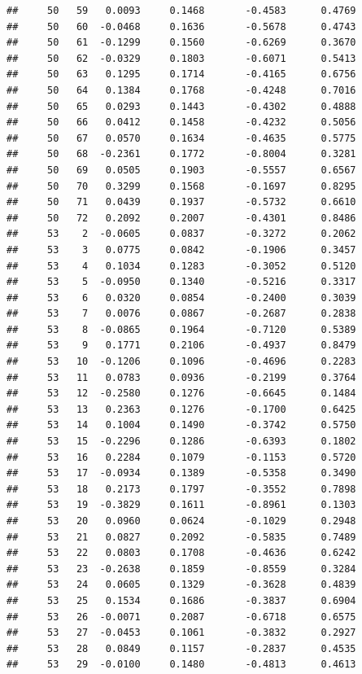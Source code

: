 \documentclass[
]{article}
\begin{document}
\begin{verbatim}
##     50   59   0.0093     0.1468       -0.4583      0.4769  
##     50   60  -0.0468     0.1636       -0.5678      0.4743  
##     50   61  -0.1299     0.1560       -0.6269      0.3670  
##     50   62  -0.0329     0.1803       -0.6071      0.5413  
##     50   63   0.1295     0.1714       -0.4165      0.6756  
##     50   64   0.1384     0.1768       -0.4248      0.7016  
##     50   65   0.0293     0.1443       -0.4302      0.4888  
##     50   66   0.0412     0.1458       -0.4232      0.5056  
##     50   67   0.0570     0.1634       -0.4635      0.5775  
##     50   68  -0.2361     0.1772       -0.8004      0.3281  
##     50   69   0.0505     0.1903       -0.5557      0.6567  
##     50   70   0.3299     0.1568       -0.1697      0.8295  
##     50   71   0.0439     0.1937       -0.5732      0.6610  
##     50   72   0.2092     0.2007       -0.4301      0.8486  
##     53    2  -0.0605     0.0837       -0.3272      0.2062  
##     53    3   0.0775     0.0842       -0.1906      0.3457  
##     53    4   0.1034     0.1283       -0.3052      0.5120  
##     53    5  -0.0950     0.1340       -0.5216      0.3317  
##     53    6   0.0320     0.0854       -0.2400      0.3039  
##     53    7   0.0076     0.0867       -0.2687      0.2838  
##     53    8  -0.0865     0.1964       -0.7120      0.5389  
##     53    9   0.1771     0.2106       -0.4937      0.8479  
##     53   10  -0.1206     0.1096       -0.4696      0.2283  
##     53   11   0.0783     0.0936       -0.2199      0.3764  
##     53   12  -0.2580     0.1276       -0.6645      0.1484  
##     53   13   0.2363     0.1276       -0.1700      0.6425  
##     53   14   0.1004     0.1490       -0.3742      0.5750  
##     53   15  -0.2296     0.1286       -0.6393      0.1802  
##     53   16   0.2284     0.1079       -0.1153      0.5720  
##     53   17  -0.0934     0.1389       -0.5358      0.3490  
##     53   18   0.2173     0.1797       -0.3552      0.7898  
##     53   19  -0.3829     0.1611       -0.8961      0.1303  
##     53   20   0.0960     0.0624       -0.1029      0.2948  
##     53   21   0.0827     0.2092       -0.5835      0.7489  
##     53   22   0.0803     0.1708       -0.4636      0.6242  
##     53   23  -0.2638     0.1859       -0.8559      0.3284  
##     53   24   0.0605     0.1329       -0.3628      0.4839  
##     53   25   0.1534     0.1686       -0.3837      0.6904  
##     53   26  -0.0071     0.2087       -0.6718      0.6575  
##     53   27  -0.0453     0.1061       -0.3832      0.2927  
##     53   28   0.0849     0.1157       -0.2837      0.4535  
##     53   29  -0.0100     0.1480       -0.4813      0.4613  

\end{verbatim}
\end{document}
